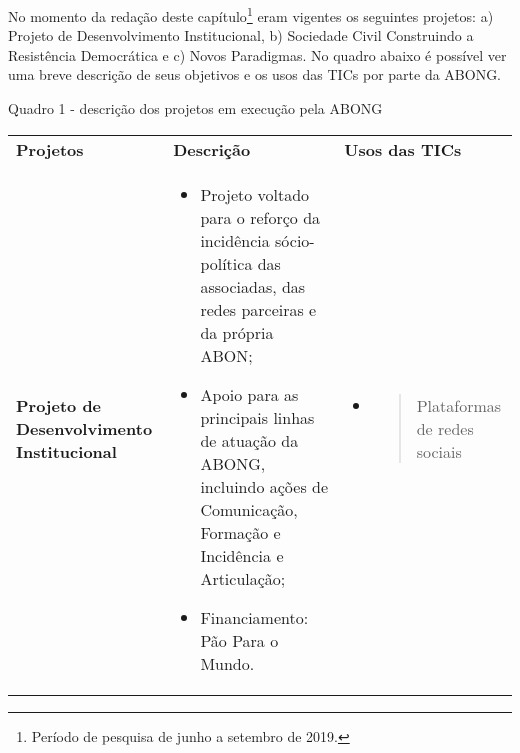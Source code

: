 No momento da redação deste capítulo\footnote{Período de pesquisa de
  junho a setembro de 2019.} eram vigentes os seguintes projetos: a)
Projeto de Desenvolvimento Institucional, b) Sociedade Civil Construindo
a Resistência Democrática e c) Novos Paradigmas. No quadro abaixo é
possível ver uma breve descrição de seus objetivos e os usos das TICs
por parte da ABONG.

Quadro 1 - descrição dos projetos em execução pela ABONG

\begin{longtable}[]{@{}lll@{}}
\toprule
\textbf{Projetos} & \textbf{Descrição} & \textbf{Usos das
TICs}\tabularnewline
\begin{minipage}[t]{0.32\columnwidth}\raggedright\strut
\textbf{Projeto de Desenvolvimento Institucional}\strut
\end{minipage} & \begin{minipage}[t]{0.32\columnwidth}\raggedright\strut
\begin{itemize}
\item
  Projeto voltado para o reforço da incidência sócio-política das
  associadas, das redes parceiras e da própria ABON;
\item
  Apoio para as principais linhas de atuação da ABONG, incluindo ações
  de Comunicação, Formação e Incidência e Articulação;
\item
  Financiamento: Pão Para o Mundo.
\end{itemize}\strut
\end{minipage} & \begin{minipage}[t]{0.32\columnwidth}\raggedright\strut
\begin{itemize}
\item
  \begin{quote}
  Plataformas de redes sociais
  \end{quote}
\end{itemize}


\end{minipage}
\end{longtable}

